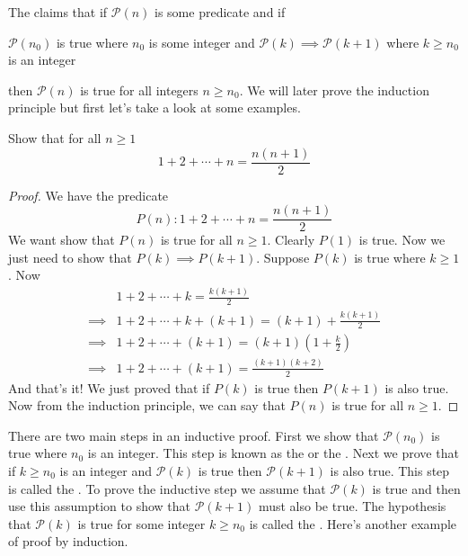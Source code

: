 \documentclass[11pt,numbers=noenddot,svgnames,dvipsnames]{scrartcl}
\begin{document}
The  claims that if $\mathcal{P}(n)$ is some predicate and if
\begin{itemize}
        \ii $\mathcal{P}(n_{0})$ is true where $n_{0}$ is some integer and 
        \ii $\mathcal{P}(k) \implies \mathcal{P}(k+1)$ where $k\geq n_{0}$ is an integer
\end{itemize}
then $\mathcal{P}(n)$ is true for all integers $n \geq n_{0}$. We will later prove the induction principle but first 
let's take a look at some examples.

\begin{example}
    Show that for all $n \geq 1$
    \[
        1 + 2 + \cdots + n = \frac{n(n+1)}{2}
    \]
\end{example}
\begin{proof}
We have the predicate 
\[
    P(n) \colon 1 + 2 + \cdots + n = \frac{n(n+1)}{2} 
\]
We want show that $P(n)$ is true for all $n\geq 1$. Clearly $P(1)$ is true. Now we just need to show that 
$P(k) \implies P(k+1)$. Suppose $P(k)$ is true where $k \geq 1$. Now
\begin{align*}
             & 1 + 2 + \cdots + k = \frac{k(k+1)}{2} \\
    \implies & 1 + 2 + \cdots + k + (k+1) = (k+1) + \frac{k(k+1)}{2} \\
    \implies & 1 + 2 + \cdots + (k+1) = (k+1) \left(1 + \frac{k}{2}\right) \\
    \implies & 1 + 2 + \cdots + (k+1) = \frac{(k+1)(k + 2)}{2}
\end{align*}
And that's it! We just proved that if $P(k)$ is true then $P(k+1)$ is also true. Now from the induction 
principle, we can say that $P(n)$ is true for all $n \geq 1$. 
\end{proof}

There are two main steps in an inductive proof. First we show that $\mathcal{P}(n_{0})$ is 
true where $n_{0}$ is an integer. This step is known as the  or the . 
Next we prove that if $k \geq n_{0}$ is an integer and $\mathcal{P}(k)$ is true then 
$\mathcal{P}(k+1)$ is also true. This step is called the . 
To prove the inductive step we assume that $\mathcal{P}(k)$ is true and then use 
this assumption to show that $\mathcal{P}(k + 1)$ must also be true. The hypothesis that 
$\mathcal{P}(k)$ is true for some integer $k\geq n_{0}$ is called the . 
Here's another example of proof by induction.
\end{document}
